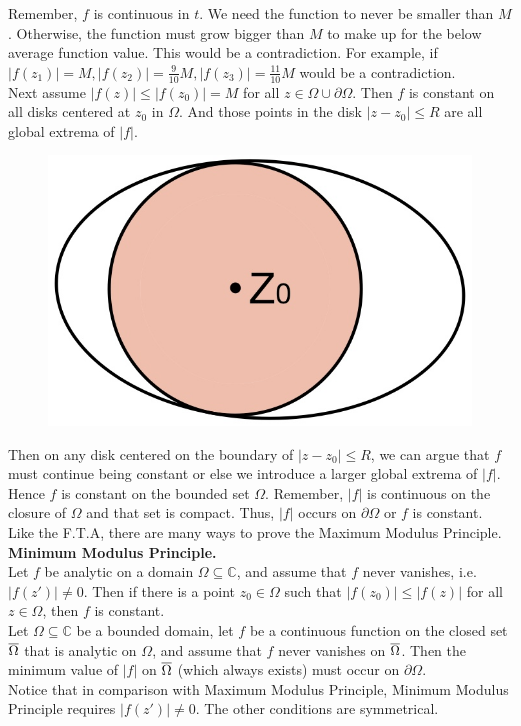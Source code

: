 \documentclass[11pt]{article}
\begin{document}
Remember, $f$ is continuous in $t$. We need the function to never be smaller than $M$. Otherwise, the function must grow bigger than $M$ to make up for the below average function value. This would be a contradiction. For example, if $|f(z_1)| = M, |f(z_2)| = \frac{9}{10}M, |f(z_3)| = \frac{11}{10}M$ would be a contradiction. \\
\newline
Next assume $|f(z)| \leqslant |f(z_0)| = M$ for all $z \in \Omega \cup \partial \Omega$. Then $f$ is constant on all disks centered at $z_0$ in $\Omega$. And those points in the disk $|z - z_0| \leqslant R$ are all global extrema of $|f|$. 
\begin{figure}[H]
\includegraphics[scale = 0.2]{14_2}
\centering
\end{figure} 
Then on any disk centered on the boundary of $|z - z_0| \leqslant R$, we can argue that $f$ must continue being constant or else we introduce a larger global extrema of $|f|$. Hence $f$ is constant on the bounded set $\Omega$. Remember, $|f|$ is continuous on the closure of $\Omega$ and that set is compact. Thus, $|f|$ occurs on $\partial \Omega$ or $f$ is constant. Like the F.T.A, there are many ways to prove the Maximum Modulus Principle. \\ 
\newline
\textbf{Minimum Modulus Principle.} \\
Let $f$ be analytic on a domain $\Omega \subseteq \mathbb{C}$, and assume that $f$ never vanishes, i.e.$|f(z')| \neq 0$. Then if there is a point $z_0 \in \Omega$ such that $|f(z_0)| \leqslant |f(z)|$ for all $z \in \Omega$, then $f$ is constant. \\
Let $\Omega \subseteq \mathbb{C}$ be a bounded domain, let $f$ be a continuous function on the closed set $\overline{\Omega}$ that is analytic on $\Omega$, and assume that $f$ never vanishes on $\overline{\Omega}$. Then the minimum value of $|f|$ on $\overline{\Omega}$ (which always exists) must occur on $\partial \Omega$. \\
Notice that in comparison with Maximum Modulus Principle, Minimum Modulus Principle requires $|f(z')| \neq 0$. The other conditions are symmetrical. 
\end{document}
